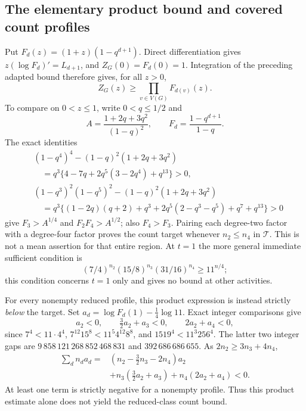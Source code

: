 \documentclass[11pt]{article}
\begin{document}
\subsection{The elementary product bound and covered count profiles}
Put $F_d(z)=(1+z)(1-q^{d+1})$. Direct differentiation gives $z(\log F_d)'=L_{d+1}$, and $Z_G(0)=F_d(0)=1$. Integration of the preceding adapted bound therefore gives, for all $z>0$,
\begin{equation}\label{eq:product}
 Z_G(z)\ge\prod_{v\in V(G)}F_{d(v)}(z).
\end{equation}
To compare on $0<z\le1$, write $0<q\le1/2$ and
\[
 A=\frac{1+2q+3q^2}{(1-q)^2},\qquad F_d=\frac{1-q^{d+1}}{1-q}.
\]
The exact identities
\begin{align*}
 &(1-q^4)^4-(1-q)^2(1+2q+3q^2)\\
 &\quad=q^3\{4-7q+2q^5(3-2q^4)+q^{13}\}>0,\\
 &(1-q^3)^2(1-q^5)^2-(1-q)^2(1+2q+3q^2)\\
 &\quad=q^3\{(1-2q)(q+2)+q^3+2q^5(2-q^3-q^5)+q^7+q^{13}\}>0
\end{align*}
give $F_3>A^{1/4}$ and $F_2F_4>A^{1/2}$; also $F_4>F_3$. Pairing each degree-two factor with a degree-four factor proves the count target whenever $n_2\le n_4$ in $\mathcal T$. This is not a mean assertion for that entire region. At $t=1$ the more general immediate sufficient condition is
\[
 (7/4)^{n_2}(15/8)^{n_3}(31/16)^{n_4}\ge11^{n/4};
\]
this condition concerns $t=1$ only and gives no bound at other activities.

For every nonempty reduced profile, this product expression is instead strictly \emph{below} the target. Set $a_d=\log F_d(1)-\frac14\log11$. Exact integer comparisons give
\[
 a_2<0,\qquad \tfrac32a_2+a_3<0,\qquad 2a_2+a_4<0,
\]
since $7^4<11\cdot4^4$, $7^{12}15^8<11^5 4^{12}8^8$, and $1519^4<11^3 256^4$. The latter two integer gaps are $9\,858\,121\,268\,852\,468\,831$ and $392\,686\,686\,655$. As $2n_2\ge3n_3+4n_4$,
\begin{align*}
 \sum_dn_da_d={}&(n_2-\tfrac32n_3-2n_4)a_2\\
 &+n_3(\tfrac32a_2+a_3)+n_4(2a_2+a_4)<0.
\end{align*}
At least one term is strictly negative for a nonempty profile. Thus this product estimate alone does not yield the reduced-class count bound.
\end{document}
